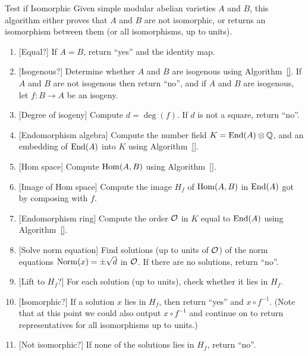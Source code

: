 \documentclass{article}
\begin{document}
\begin{algorithm}{Test if Isomorphic}\label{alg:isom}
Given simple modular abelian varieties $A$ and $B$,
this algorithm either proves that $A$ and $B$ are not isomorphic,
or returns an isomorphism between them (or all isomorphisms,
up to units).

\begin{enumerate}
\item{}[Equal?] If $A=B$, return ``yes'' and the identity map.
\item{}[Isogenous?]  Determine whether $A$ and $B$ are isogenous using Algorithm~\ref{}.
If $A$ and $B$ are not isogenous then return ``no'', and if
$A$ and $B$ are isogenous, let $f: B \to A$ be an isogeny.
\item{}[Degree of isogeny]  Compute $d = \deg(f)$. If $d$ is not a square, return ``no''.
\item{}[Endomorphism algebra]
Compute the number field $K=\operatorname{End}(A)\otimes\mathbb{Q}$, and
an embedding of $\operatorname{End}(A)$ into $K$ using Algorithm~\ref{}.
\item{}[Hom space] Compute $\operatorname{Hom}(A,B)$ using Algorithm~\ref{}.
\item{}[Image of Hom space]  Compute the image $H_f$ of $\operatorname{Hom}(A,B)$ in $\operatorname{End}(A)$
got by composing with $f$.
\item{}[Endomorphism ring] Compute the order $\mathcal{O}$ in $K$ equal to $\operatorname{End}(A)$
using Algorithm~\ref{}.
\item{}[Solve norm equation] Find solutions (up to units of $\mathcal{O}$) of the norm equations
$\operatorname{Norm}(x) = \pm \sqrt{d}$ in $\mathcal{O}$. If there are no solutions, return ``no''.
\item{}[Lift to $H_f$?]   For each solution (up to units), check whether it lies in $H_f$.
\item{}[Isomorphic?]   If a solution $x$ lies in $H_f$, then return ``yes'' and $x\circ f^{-1}$.
(Note that at this point we could also output $x\circ f^{-1}$ and continue
on to return representatives for all isomorphisms up to units.)

\item{}[Not isomorphic?]   If none of the solutions lies in $H_f$, return ``no''.
\end{enumerate}
\end{algorithm}
\end{document}
